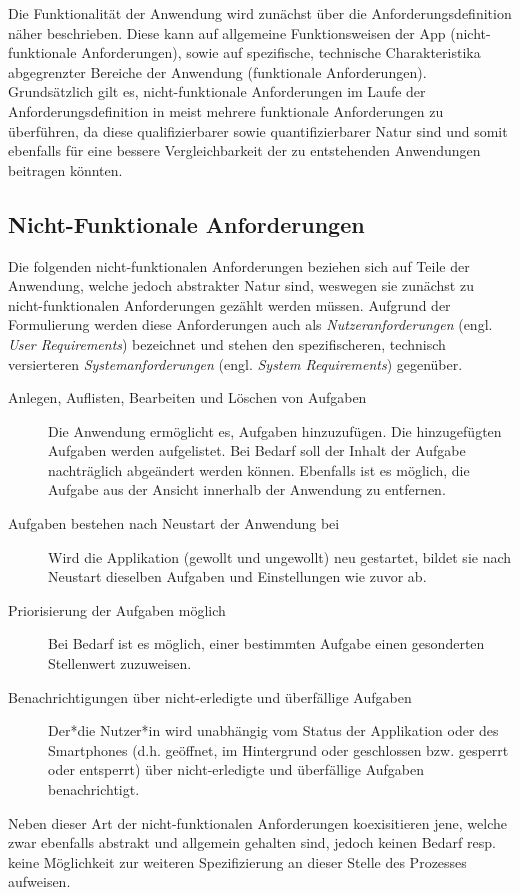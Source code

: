 Die Funktionalität der Anwendung wird zunächst über die Anforderungsdefinition näher beschrieben. Diese kann auf allgemeine Funktionsweisen der App (nicht-funktionale Anforderungen), sowie auf spezifische, technische Charakteristika abgegrenzter Bereiche der Anwendung (funktionale Anforderungen). Grundsätzlich gilt es, nicht-funktionale Anforderungen im Laufe der Anforderungsdefinition in meist mehrere funktionale Anforderungen zu überführen, da diese qualifizierbarer sowie quantifizierbarer Natur sind und somit ebenfalls für eine bessere Vergleichbarkeit der zu entstehenden Anwendungen beitragen könnten.

\subsection{Nicht-Funktionale Anforderungen}
Die folgenden nicht-funktionalen Anforderungen beziehen sich auf Teile der Anwendung, welche jedoch abstrakter Natur sind, weswegen sie zunächst zu nicht-funktionalen Anforderungen gezählt werden müssen. Aufgrund der Formulierung werden diese Anforderungen auch als \textit{Nutzeranforderungen} (engl. \textit{User Requirements}) bezeichnet und stehen den spezifischeren, technisch versierteren \textit{Systemanforderungen} (engl. \textit{System Requirements}) gegenüber.
\begin{description}
    \item[Anlegen, Auflisten, Bearbeiten und Löschen von Aufgaben] Die Anwendung ermöglicht es, Aufgaben hinzuzufügen. Die hinzugefügten Aufgaben werden aufgelistet. Bei Bedarf soll der Inhalt der Aufgabe nachträglich abgeändert werden können. Ebenfalls ist es möglich, die Aufgabe aus der Ansicht innerhalb der Anwendung zu entfernen.
    \item[Aufgaben bestehen nach Neustart der Anwendung bei] Wird die Applikation (gewollt und ungewollt) neu gestartet, bildet sie nach Neustart dieselben Aufgaben und Einstellungen wie zuvor ab.
    \item[Priorisierung der Aufgaben möglich] Bei Bedarf ist es möglich, einer bestimmten Aufgabe einen gesonderten Stellenwert zuzuweisen.
    \item[Benachrichtigungen über nicht-erledigte und überfällige Aufgaben] Der*die Nutzer*in wird unabhängig vom Status der Applikation oder des Smartphones (d.h. geöffnet, im Hintergrund oder geschlossen bzw. gesperrt oder entsperrt) über nicht-erledigte und überfällige Aufgaben benachrichtigt.
\end{description}
Neben dieser Art der nicht-funktionalen Anforderungen koexisitieren jene, welche zwar ebenfalls abstrakt und allgemein gehalten sind, jedoch keinen Bedarf resp. keine Möglichkeit zur weiteren Spezifizierung an dieser Stelle des Prozesses aufweisen.
